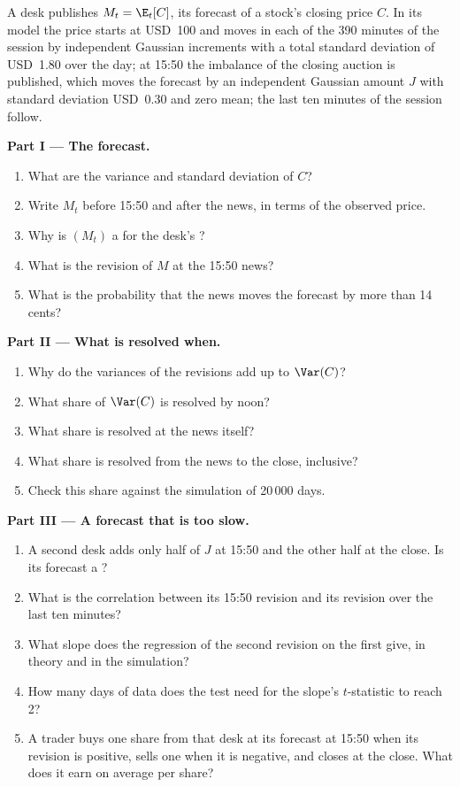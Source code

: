 \begin{problem}\label{pb:qm:probability-at-speed:1}
A desk publishes $M_t = \E_t[C]$, its forecast of a stock's closing price $C$. In its model
the price starts at USD~100 and moves in each of the 390 minutes of the session by
independent Gaussian increments with a total standard deviation of USD~1.80 over the day; at
15:50 the imbalance of the closing auction is published, which moves the forecast by an
independent Gaussian amount $J$ with standard deviation USD~0.30 and zero mean; the last ten
minutes of the session follow.

\medskip\noindent\textbf{Part I --- The forecast.}
\begin{enumerate}
\item What are the variance and standard deviation of $C$?
\item Write $M_t$ before 15:50 and after the news, in terms of the observed price.
\item Why is $(M_t)$ a  for the desk's ?
\item What is the revision of $M$ at the 15:50 news?
\item What is the probability that the news moves the forecast by more than 14 cents?
\end{enumerate}

\medskip\noindent\textbf{Part II --- What is resolved when.}
\begin{enumerate}[resume]
\item Why do the variances of the revisions add up to $\Var(C)$?
\item What share of $\Var(C)$ is resolved by noon?
\item What share is resolved at the news itself?
\item What share is resolved from the news to the close, inclusive?
\item Check this share against the simulation of 20\,000 days.
\end{enumerate}

\medskip\noindent\textbf{Part III --- A forecast that is too slow.}
\begin{enumerate}[resume]
\item A second desk adds only half of $J$ at 15:50 and the other half at the close. Is its
forecast a ?
\item What is the correlation between its 15:50 revision and its revision over the last ten
minutes?
\item What slope does the regression of the second revision on the first give, in theory and
in the simulation?
\item How many days of data does the test need for the slope's $t$-statistic to reach 2?
\item A trader buys one share from that desk at its forecast at 15:50 when its revision is
positive, sells one when it is negative, and closes at the close. What does it earn on average
per share?
\end{enumerate}


\end{problem}
